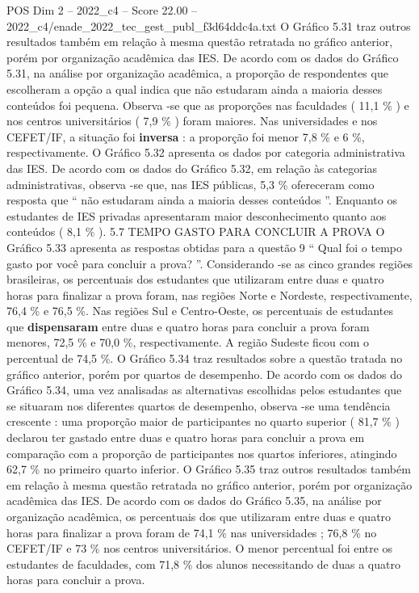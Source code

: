 \begin{textsample}{POS Dim 2 – 2022\_c4 – Score 22.00 – 2022\_c4/enade\_2022\_tec\_gest\_publ\_f3d64ddc4a.txt}
O Gráfico 5.31 traz outros resultados também em relação à mesma questão retratada no gráfico anterior, porém por organização acadêmica das IES.
De acordo com os dados do Gráfico 5.31, na análise por organização acadêmica, a proporção de respondentes que escolheram a opção a qual indica que não estudaram ainda a maioria desses conteúdos foi pequena.
Observa -se que as proporções nas faculdades ( 11,1 \% ) e nos centros universitários ( 7,9 \% ) foram maiores.
Nas universidades e nos CEFET/IF, a situação foi \textbf{inversa} : a proporção foi menor 7,8 \% e 6 \%, respectivamente.
O Gráfico 5.32 apresenta os dados por categoria administrativa das IES.
De acordo com os dados do Gráfico 5.32, em relação às categorias administrativas, observa -se que, nas IES públicas, 5,3 \% ofereceram como resposta que “ não estudaram ainda a maioria desses conteúdos ”.
Enquanto os estudantes de IES privadas apresentaram maior desconhecimento quanto aos conteúdos ( 8,1 \% ). 5.7 TEMPO GASTO PARA CONCLUIR A PROVA O Gráfico 5.33 apresenta as respostas obtidas para a questão 9 “ Qual foi o tempo gasto por você para concluir a prova? ”.
Considerando -se as cinco grandes regiões brasileiras, os percentuais dos estudantes que utilizaram entre duas e quatro horas para finalizar a prova foram, nas regiões Norte e Nordeste, respectivamente, 76,4 \% e 76,5 \%.
Nas regiões Sul e Centro-Oeste, os percentuais de estudantes que \textbf{dispensaram} entre duas e quatro horas para concluir a prova foram menores, 72,5 \% e 70,0 \%, respectivamente.
A região Sudeste ficou com o percentual de 74,5 \%.
O Gráfico 5.34 traz resultados sobre a questão tratada no gráfico anterior, porém por quartos de desempenho.
De acordo com os dados do Gráfico 5.34, uma vez analisadas as alternativas escolhidas pelos estudantes que se situaram nos diferentes quartos de desempenho, observa -se uma tendência crescente : uma proporção maior de participantes no quarto superior ( 81,7 \% ) declarou ter gastado entre duas e quatro horas para concluir a prova em comparação com a proporção de participantes nos quartos inferiores, atingindo 62,7 \% no primeiro quarto inferior.
O Gráfico 5.35 traz outros resultados também em relação à mesma questão retratada no gráfico anterior, porém por organização acadêmica das IES.
De acordo com os dados do Gráfico 5.35, na análise por organização acadêmica, os percentuais dos que utilizaram entre duas e quatro horas para finalizar a prova foram de 74,1 \% nas universidades ; 76,8 \% no CEFET/IF e 73 \% nos centros universitários.
O menor percentual foi entre os estudantes de faculdades, com 71,8 \% dos alunos necessitando de duas a quatro horas para concluir a prova.

\end{textsample}
